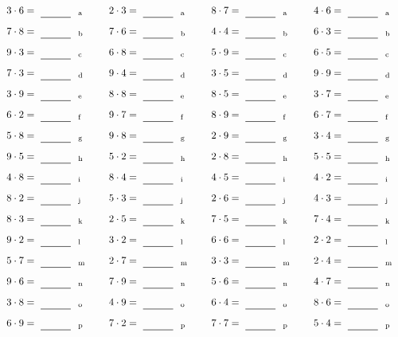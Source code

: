 \documentclass
[
  draft    = true,
  fontsize = 11pt,
  parskip  = half-
]
{scrartcl}
\begin{document}
\par\vfill\par
\begin{align*}
    \pline{3\cdot6}&=\rline{a}
  & \pline{2\cdot3}&=\rline{a}
  & \pline{8\cdot7}&=\rline{a}
  & \pline{4\cdot6}&=\rline{a} \\[1ex]
    \pline{7\cdot8}&=\rline{b}
  & \pline{7\cdot6}&=\rline{b}
  & \pline{4\cdot4}&=\rline{b}
  & \pline{6\cdot3}&=\rline{b} \\[1ex]
    \pline{9\cdot3}&=\rline{c}
  & \pline{6\cdot8}&=\rline{c}
  & \pline{5\cdot9}&=\rline{c}
  & \pline{6\cdot5}&=\rline{c} \\[1ex]
    \pline{7\cdot3}&=\rline{d}
  & \pline{9\cdot4}&=\rline{d}
  & \pline{3\cdot5}&=\rline{d}
  & \pline{9\cdot9}&=\rline{d} \\[1ex]
    \pline{3\cdot9}&=\rline{e}
  & \pline{8\cdot8}&=\rline{e}
  & \pline{8\cdot5}&=\rline{e}
  & \pline{3\cdot7}&=\rline{e} \\[1ex]
    \pline{6\cdot2}&=\rline{f}
  & \pline{9\cdot7}&=\rline{f}
  & \pline{8\cdot9}&=\rline{f}
  & \pline{6\cdot7}&=\rline{f} \\[1ex]
    \pline{5\cdot8}&=\rline{g}
  & \pline{9\cdot8}&=\rline{g}
  & \pline{2\cdot9}&=\rline{g}
  & \pline{3\cdot4}&=\rline{g} \\[1ex]
    \pline{9\cdot5}&=\rline{h}
  & \pline{5\cdot2}&=\rline{h}
  & \pline{2\cdot8}&=\rline{h}
  & \pline{5\cdot5}&=\rline{h} \\[1ex]
    \pline{4\cdot8}&=\rline{i}
  & \pline{8\cdot4}&=\rline{i}
  & \pline{4\cdot5}&=\rline{i}
  & \pline{4\cdot2}&=\rline{i} \\[1ex]
    \pline{8\cdot2}&=\rline{j}
  & \pline{5\cdot3}&=\rline{j}
  & \pline{2\cdot6}&=\rline{j}
  & \pline{4\cdot3}&=\rline{j} \\[1ex]
    \pline{8\cdot3}&=\rline{k}
  & \pline{2\cdot5}&=\rline{k}
  & \pline{7\cdot5}&=\rline{k}
  & \pline{7\cdot4}&=\rline{k} \\[1ex]
    \pline{9\cdot2}&=\rline{l}
  & \pline{3\cdot2}&=\rline{l}
  & \pline{6\cdot6}&=\rline{l}
  & \pline{2\cdot2}&=\rline{l} \\[1ex]
    \pline{5\cdot7}&=\rline{m}
  & \pline{2\cdot7}&=\rline{m}
  & \pline{3\cdot3}&=\rline{m}
  & \pline{2\cdot4}&=\rline{m} \\[1ex]
    \pline{9\cdot6}&=\rline{n}
  & \pline{7\cdot9}&=\rline{n}
  & \pline{5\cdot6}&=\rline{n}
  & \pline{4\cdot7}&=\rline{n} \\[1ex]
    \pline{3\cdot8}&=\rline{o}
  & \pline{4\cdot9}&=\rline{o}
  & \pline{6\cdot4}&=\rline{o}
  & \pline{8\cdot6}&=\rline{o} \\[1ex]
    \pline{6\cdot9}&=\rline{p}
  & \pline{7\cdot2}&=\rline{p}
  & \pline{7\cdot7}&=\rline{p}
  & \pline{5\cdot4}&=\rline{p}
\end{align*}
\end{document}
